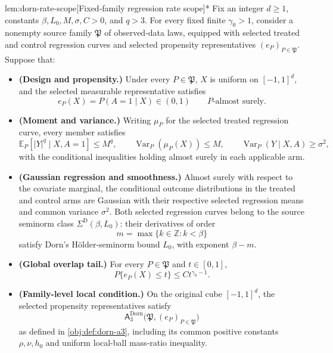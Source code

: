 \documentclass[11pt]{article}
\begin{document}
\begin{propositionv}{lem:dorn-rate-scope}[Fixed-family regression rate scope]*
Fix an integer \(d\ge1\), constants \(\beta,L_0,M,\sigma,C>0\), and \(q>3\). For every fixed finite \(\gamma_0>1\), consider a nonempty source family \(\mathfrak P\) of observed-data laws, equipped with selected treated and control regression curves and selected propensity representatives \((e_P)_{P\in\mathfrak P}\). Suppose that:
\begin{itemize}
\item \textbf{(Design and propensity.)} Under every \(P\in\mathfrak P\), \(X\) is uniform on \([-1,1]^d\), and the selected measurable representative satisfies
\[
e_P(X)=P(A=1\mid X)\in(0,1)
\qquad P\text{-almost surely}.
\]
\item \textbf{(Moment and variance.)} Writing \(\mu_P\) for the selected treated regression curve, every member satisfies
\[
\mathbb E_P\!\left[|Y|^q\mid X,A=1\right]\le M^q,\qquad
\operatorname{Var}_P\!\left(\mu_P(X)\right)\le M,\qquad
\operatorname{Var}_P(Y\mid X,A)\ge\sigma^2,
\]
with the conditional inequalities holding almost surely in each applicable arm.
\item \textbf{(Gaussian regression and smoothness.)} Almost surely with respect to the covariate marginal, the conditional outcome distributions in the treated and control arms are Gaussian with their respective selected regression means and common variance \(\sigma^2\). Both selected regression curves belong to the source seminorm class \(\Sigma^{\mathrm D}(\beta,L_0)\): their derivatives of order
\[
m=\max\{k\in\mathbb Z:k<\beta\}
\]
satisfy Dorn's Hölder-seminorm bound \(L_0\), with exponent \(\beta-m\).
\item \textbf{(Global overlap tail.)} For every \(P\in\mathfrak P\) and \(t\in[0,1]\),
\[
P\{e_P(X)\le t\}\le Ct^{\gamma_0-1}.
\]
\item \textbf{(Family-level local condition.)} On the original cube \([-1,1]^d\), the selected propensity representatives satisfy
\[
\mathsf A_{3}^{\mathrm{Dorn}}
\bigl(\mathfrak P,(e_P)_{P\in\mathfrak P}\bigr)
\]
as defined in \cref{obj:def:dorn-a3}, including its common positive constants \(\rho,\nu,h_0\) and uniform local-ball mass-ratio inequality.
\end{itemize}


\end{propositionv}
\end{document}
